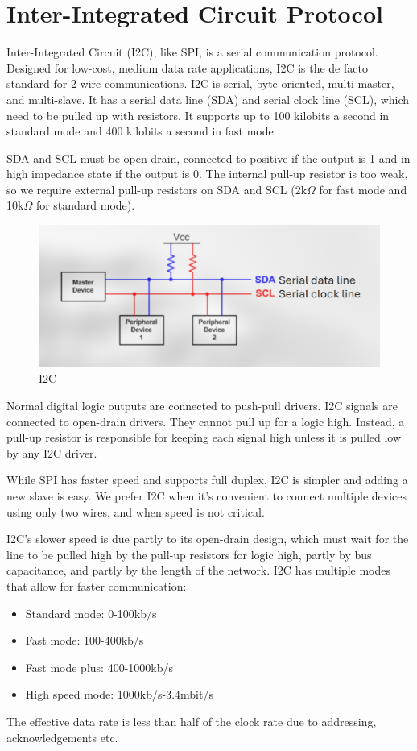 \section{Inter-Integrated Circuit Protocol}

Inter-Integrated Circuit (I2C), like SPI,
is a serial communication protocol.
Designed for low-cost, medium data rate applications,
I2C is the de facto standard for 2-wire communications.
I2C is serial, byte-oriented, multi-master,
and multi-slave. It has a serial data line
(SDA) and serial clock line (SCL), which
need to be pulled up with resistors.
It supports up to 100 kilobits a second
in standard mode and 400 kilobits a second
in fast mode.

SDA and SCL must be open-drain, connected
to positive if the output is 1 and in
high impedance state if the output is 0.
The internal pull-up resistor is too weak,
so we require external pull-up resistors
on SDA and SCL (2k$\Omega$ for fast mode and
10k$\Omega$ for standard mode).

\begin{figure}
    \includegraphics{images/i2c.png}
    \caption{I2C}
    \label{fig:i2c}
\end{figure}

Normal digital logic outputs are connected to push-pull drivers.
I2C signals are connected to open-drain drivers.
They cannot pull up for a logic high. Instead, a pull-up
resistor is responsible for keeping each signal high unless
it is pulled low by any I2C driver.

While SPI has faster speed and supports full
duplex, I2C is simpler and adding a new
slave is easy. We prefer I2C when it's
convenient to connect multiple devices
using only two wires, and when speed is
not critical.

I2C's slower speed is due partly
to its open-drain design, which must
wait for the line to be pulled high by
the pull-up resistors for logic high,
partly by bus capacitance, and partly
by the length of the network.
I2C has multiple modes that allow for
faster communication:
\begin{itemize}
    \item Standard mode: 0-100kb/s
    \item Fast mode: 100-400kb/s
    \item Fast mode plus: 400-1000kb/s
    \item High speed mode: 1000kb/s-3.4mbit/s
\end{itemize}
The effective data rate is less than half of the
clock rate due to addressing, acknowledgements etc.

